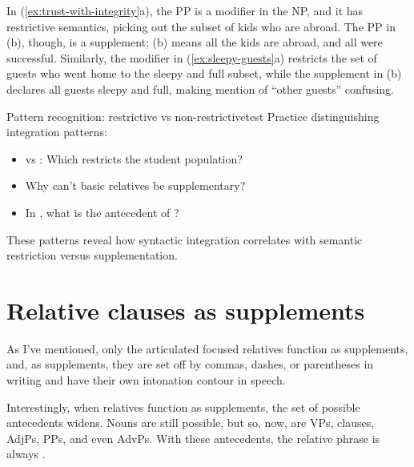 In (\ref{ex:trust-with-integrity}a), the PP  is a modifier in the NP, and it has restrictive semantics, picking out the subset of kids who are abroad. The PP in (b), though, is a supplement; (b) means all the kids are abroad, and all were successful. Similarly, the  modifier in (\ref{ex:sleepy-guests}a) restricts the set of guests who went home to the sleepy and full subset, while the supplement in (b) declares all guests sleepy and full, making mention of \enquote{other guests} confusing.

\begin{tblsframedsymbol}{Pattern recognition: restrictive vs non-restrictive}{test}
Practice distinguishing integration patterns:
\begin{itemize}[noitemsep, leftmargin=*]
    \item {} vs : Which restricts the student population?
    \item Why can't basic relatives be supplementary? 
    \item In , what is the antecedent of ?
\end{itemize}
These patterns reveal how syntactic integration correlates with semantic restriction versus supplementation.
\end{tblsframedsymbol}

\section{Relative clauses as supplements} \label{sec:rel-clause-supps}

As I've mentioned, only the articulated focused relatives function as supplements, and, as supplements, they are set off by commas, dashes, or parentheses in writing and have their own intonation contour in speech.

\ea
    \z
\z
Interestingly, when relatives function as supplements, the set of possible antecedents widens. Nouns are still possible, but so, now, are VPs, clauses, AdjPs, PPs, and even AdvPs. With these antecedents, the relative phrase is always .

